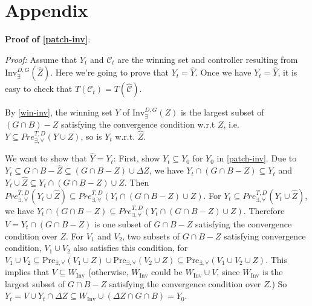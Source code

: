 
\iffalse
\section{Appendix}
\textbf{Proof of \eqref{patch-inv}}:

\emph{Proof:}
	Assume that $ Y_t $ and $ \mathcal{C}_t $ are the winning set and controller resulting from $ \text{Inv}_{\exists}^{D,G} (\widehat{Z}) $. Here we're going to prove that $ Y_t=\widehat{Y}$. Once we have $ Y_t=\widehat{Y}$, it is easy to check that $ T(\mathcal{C}_t) = T(\widehat{\mathcal{C}}) $.
	
	By \eqref{win-inv}, the winning set $ Y $ of $ \text{Inv}_{\exists}^{D,G} (Z) $ is the largest subset of $ (G\cap B) - Z  $ satisfying the convergence condition w.r.t $ Z $, i.e. $ Y \subseteq Pre^{T,D}_{\exists, \forall}(Y\cup Z) $, so is $ Y_t $ w.r.t. $ \widehat{Z} $.
	
	We want to show that $ \widehat{Y} = Y_t$: First, show $ Y_t \subseteq Y_0 $ for $ Y_0 $ in \eqref{patch-inv}. Due to $ Y_t \subseteq G\cap B-\widehat{Z} \subseteq (G\cap B -Z)\cup \Delta Z $, we have $ Y_t\cap (G\cap B-Z)\subseteq Y_t $ and $ Y_t\cup \widehat{Z} \subseteq Y_t\cap (G\cap B-Z)\cup Z$. Then $ Pre^{T,D}_{\exists,\forall}(Y_t\cup \widehat{Z}) \subseteq Pre^{T,D}_{\exists,\forall}(Y_t\cap (G\cap B-Z)\cup Z)$. For $ Y_t \subseteq Pre^{T,D}_{\exists,\forall}(Y_t\cup \widehat{Z})$, we have $ Y_t\cap (G\cap B-Z)\subseteq Pre^{T,D}_{\exists,\forall}(Y_t\cap (G\cap B-Z)\cup Z) $. Therefore $ V= Y_t \cap (G\cap B -Z) $ is one subset of $ G\cap B -Z $ satisfying the convergence condition over $ Z $. For $ V_1 $ and $ V_2 $, two subsets of $ G\cap B-Z $ satisfying convergence condition, $ V_1\cup V_2 $ also satisfies this condition, for $ V_1\cup V_2\subseteq \text{Pre}_{\exists,\forall}(V_1\cup Z)\cup \text{Pre}_{\exists,\forall}(V_2\cup Z)\subseteq \text{Pre}_{\exists,\forall}(V_1\cup V_2\cup Z) $. This implies that $ V \subseteq W_{\text{Inv}} $ (otherwise, $ W_{\text{Inv}} $ could be $ W_{\text{Inv}}\cup V $, since $ W_{\text{Inv}} $ is the largest subset of $ G\cap B-Z $ satisfying the convergence condition over $ Z $.) So $ Y_t = V\cup Y_t\cap \Delta Z \subseteq W_{\text{Inv}}\cup (\Delta Z \cap G\cap B) = Y_0$. 
	
